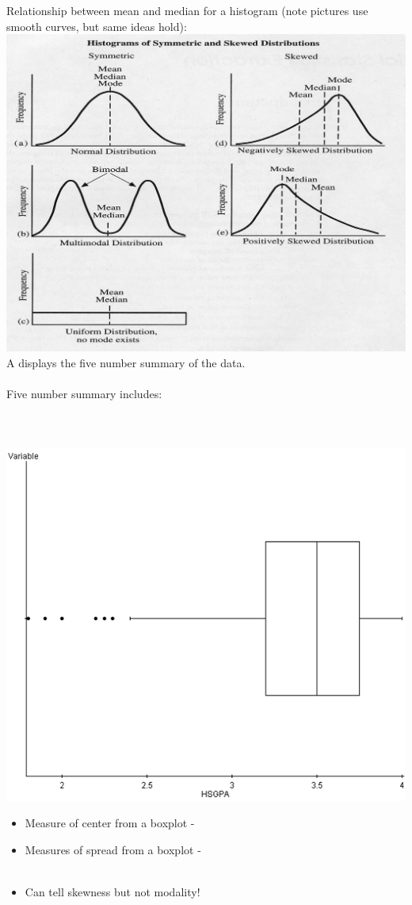 Relationship between mean and median for a histogram (note pictures use smooth curves, but same ideas hold):\\
\includegraphics[scale=0.6]{meanmedianrelationship}\\


A \underbar{~~~~~~~~~~~~~~~~~~~~~~~~~~~~~~~~~~~~} displays the five number summary of the data.\\~\\
Five number summary includes:\\~\\~\\~\\

\includegraphics[scale=0.5]{boxplot2}\\
\begin{itemize}
\item Measure of center from a boxplot - \\
\item Measures of spread from a boxplot - \\~\\
\item Can tell skewness but not modality!
\end{itemize}

